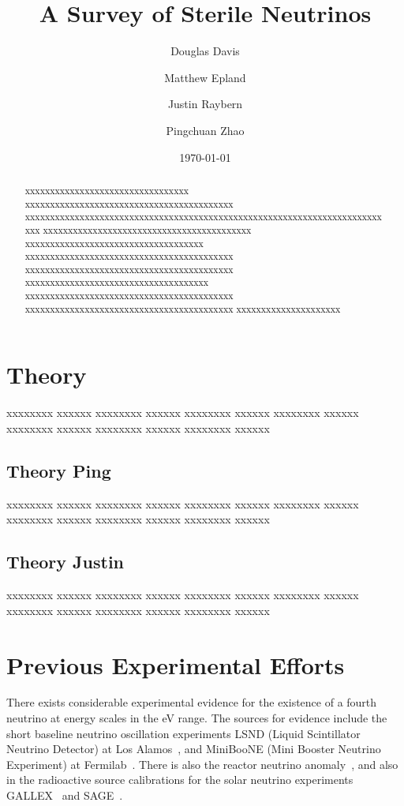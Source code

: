 \documentclass[aps,prd,twocolumn,nofootinbib]{revtex4-1}
\begin{document}
\title{A Survey of Sterile Neutrinos}
\author{Douglas Davis}
\author{Matthew Epland}
\author{Justin Raybern}
\author{Pingchuan Zhao}
\date{\today}
\begin{abstract}
  xxxxxxxxxxxxxxxxxxxxxxxxxxxxxxxxx xxxxxxxxxxxxxxxxxxxxxxxxxxxxxxxxxxxxxxxxxx xxxxxxxxxxxxxxxxxxxxxxxxxxxxxxxxxxxxxxxxxxxxxxxxxxxxxxxxxxxxxxxxxxxxxxxxxxx xxxxxxxxxxxxxxxxxxxxxxxxxxxxxxxxxxxxxxxxxx xxxxxxxxxxxxxxxxxxxxxxxxxxxxxxxxxxxx xxxxxxxxxxxxxxxxxxxxxxxxxxxxxxxxxxxxxxxxxx xxxxxxxxxxxxxxxxxxxxxxxxxxxxxxxxxxxxxxxxxx xxxxxxxxxxxxxxxxxxxxxxxxxxxxxxxxxxxxx xxxxxxxxxxxxxxxxxxxxxxxxxxxxxxxxxxxxxxxxxx xxxxxxxxxxxxxxxxxxxxxxxxxxxxxxxxxxxxxxxxxx xxxxxxxxxxxxxxxxxxxxx
\end{abstract}\maketitle
\section{Theory}
\label{sec:theory}
xxxxxxxx xxxxxx xxxxxxxx xxxxxx xxxxxxxx xxxxxx xxxxxxxx xxxxxx xxxxxxxx xxxxxx xxxxxxxx xxxxxx xxxxxxxx xxxxxx
\subsection{Theory Ping}
xxxxxxxx xxxxxx xxxxxxxx xxxxxx xxxxxxxx xxxxxx xxxxxxxx xxxxxx xxxxxxxx xxxxxx xxxxxxxx xxxxxx xxxxxxxx xxxxxx
\subsection{Theory Justin}
xxxxxxxx xxxxxx xxxxxxxx xxxxxx xxxxxxxx xxxxxx xxxxxxxx xxxxxx xxxxxxxx xxxxxx xxxxxxxx xxxxxx xxxxxxxx xxxxxx
\section{Previous Experimental Efforts}
There exists considerable experimental evidence for the existence of a fourth neutrino at energy scales in the eV range. The sources for evidence include the short baseline neutrino oscillation experiments LSND (Liquid Scintillator Neutrino Detector) at Los Alamos~\cite{LSND}, and MiniBooNE (Mini Booster Neutrino Experiment) at Fermilab~\cite{mini1,mini2}. There is also the reactor neutrino anomaly~\cite{reactor_anom1}, and also in the radioactive source calibrations for the solar neutrino experiments GALLEX~\cite{gallex1,gallex2} and SAGE~\cite{sage1,sage2}.
\end{document}
